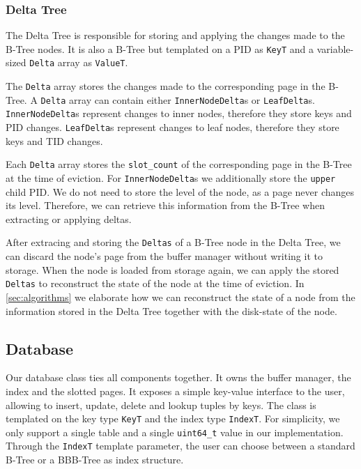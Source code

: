 \subsubsection*{Delta Tree}
The Delta Tree is responsible for storing and applying the changes made to the B-Tree nodes.
It is also a B-Tree but templated on a \ac{PID} as \texttt{KeyT} and a variable-sized \texttt{Delta} array as \texttt{ValueT}.

The \texttt{Delta} array stores the changes made to the corresponding page in the B-Tree.
A \texttt{Delta} array can contain either \texttt{InnerNodeDelta}s or \texttt{LeafDelta}s.
\texttt{InnerNodeDelta}s represent changes to inner nodes, therefore they store keys and \ac{PID} changes.
\texttt{LeafDelta}s represent changes to leaf nodes, therefore they store keys and \ac{TID} changes.

Each \texttt{Delta} array stores the \texttt{slot\_count} of the corresponding page in the B-Tree at the time of eviction.
For \texttt{InnerNodeDelta}s we additionally store the \texttt{upper} child \ac{PID}.
We do not need to store the level of the node, as a page never changes its level. 
Therefore, we can retrieve this information from the B-Tree when extracting or applying deltas.

After extracing and storing the \texttt{Deltas} of a B-Tree node in the Delta Tree, we can discard the node's page from the buffer manager without writing it to storage.
When the node is loaded from storage again, we can apply the stored \texttt{Deltas} to reconstruct the state of the node at the time of eviction.
In \autoref{sec:algorithms} we elaborate how we can reconstruct the state of a node from the information stored in the Delta Tree together with the disk-state of the node.

\subsection*{Database}
Our database class ties all components together.
It owns the buffer manager, the index and the slotted pages.
It exposes a simple key-value interface to the user, allowing to insert, update, delete and lookup tuples by keys.
The class is templated on the key type \texttt{KeyT} and the index type \texttt{IndexT}.
For simplicity, we only support a single table and a single \texttt{uint64\_t} value in our implementation.
Through the \texttt{IndexT} template parameter, the user can choose between a standard B-Tree or a BBB-Tree as index structure.

